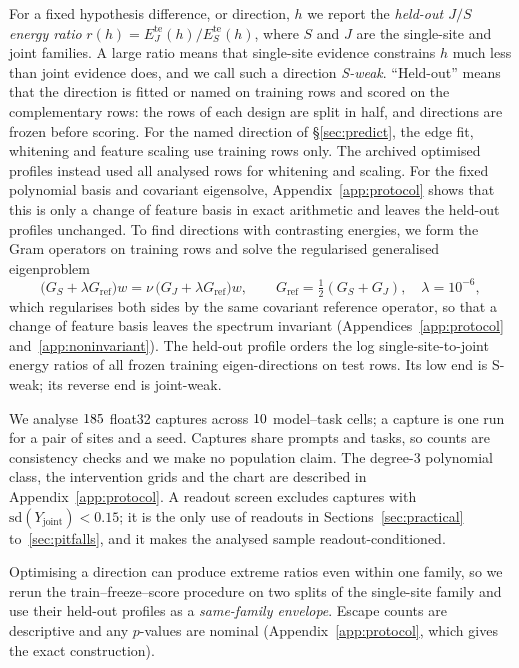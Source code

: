 \documentclass{article}
\theoremstyle{plain}
\theoremstyle{definition}
\begin{document}
For a fixed hypothesis difference, or direction, $h$ we report the \emph{held-out $J/S$ energy ratio}
$r(h)=E_J^{\mathrm{te}}(h)/E_S^{\mathrm{te}}(h)$, where $S$ and $J$ are the single-site and joint families. A large
ratio means that single-site evidence constrains $h$ much less than joint evidence does, and we call such a direction
\emph{S-weak}. ``Held-out'' means that the direction is fitted or named on training rows and scored on the
complementary rows: the rows of each design are split in half, and directions are frozen before scoring. For the named
direction of \S\ref{sec:predict}, the edge fit, whitening and feature scaling use training rows only. The archived
optimised profiles instead used all analysed rows for whitening and scaling. For the fixed polynomial basis and
covariant eigensolve, Appendix~\ref{app:protocol} shows that this is only a change of feature basis in exact
arithmetic and leaves the held-out profiles unchanged. To find directions with contrasting energies, we form the Gram operators on training rows and solve the regularised generalised
eigenproblem
\[
  \bigl(G_S+\lambda G_{\mathrm{ref}}\bigr)w=\nu\,\bigl(G_J+\lambda G_{\mathrm{ref}}\bigr)w,\qquad
  G_{\mathrm{ref}}=\tfrac12(G_S+G_J),\quad\lambda=10^{-6},
\]
which regularises both sides by the same covariant reference operator, so that a change of feature basis leaves the
spectrum invariant (Appendices~\ref{app:protocol} and~\ref{app:noninvariant}). The held-out profile orders the log
single-site-to-joint energy ratios of all frozen training eigen-directions on test rows. Its low end is S-weak;
its reverse end is joint-weak.

We analyse $185$ float32 captures across $10$ model--task cells; a capture is one run for a pair of
sites and a seed. Captures share prompts and tasks, so counts are consistency checks and we make no population claim.
The degree-3 polynomial class, the intervention grids and the chart are described in Appendix~\ref{app:protocol}. A
readout screen excludes captures with $\mathrm{sd}(Y_{\mathrm{joint}})<0.15$; it is the only use of readouts in
Sections~\ref{sec:practical} to~\ref{sec:pitfalls}, and it makes the analysed sample readout-conditioned.

Optimising a direction can produce extreme ratios even within one family, so we rerun the train--freeze--score procedure on two splits of the single-site family and use their held-out profiles as a \emph{same-family envelope}. Escape counts are descriptive and any $p$-values are nominal (Appendix~\ref{app:protocol}, which gives the exact construction).
\end{document}
